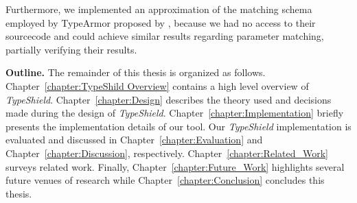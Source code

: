 Furthermore, we implemented an approximation of the matching schema employed by TypeArmor proposed by \cite{veen:typearmor}, because we had no access to their sourcecode and could achieve similar results regarding parameter matching, partially verifying their results.

\textbf{Outline.}
\label{Outline}
The remainder of this thesis is organized as follows.
Chapter~\ref{chapter:TypeShild Overview} contains a high level overview of \textit{TypeShield}.
Chapter~\ref{chapter:Design} describes the theory used and decisions made during the design of \textit{TypeShield}.
Chapter~\ref{chapter:Implementation} briefly presents the implementation details of our tool.
Our \textit{TypeShield} implementation is evaluated and discussed in
Chapter~\ref{chapter:Evaluation} and Chapter~\ref{chapter:Discussion}, respectively.
Chapter~\ref{chapter:Related_Work} surveys related work.
Finally, Chapter~\ref{chapter:Future_Work} highlights several future venues of research while
Chapter~\ref{chapter:Conclusion} concludes this thesis.


